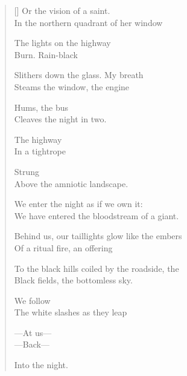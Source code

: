 \begin{verse}[\versewidth]
Or the vision of a saint.\\
In the northern quadrant of her window

The lights on the highway\\
Burn. \quad Rain-black

Slithers down the glass. \quad My breath\\
Steams the window, the engine

Hums, the bus\\
Cleaves the night in two.

The highway\\
In a tightrope

Strung\\
Above the amniotic landscape.

We enter the night as if we own it:\\
We have entered the bloodstream of a giant.

Behind us, our taillights glow like the embers\\
Of a ritual fire, an offering

To the black hills coiled by the roadside, the\\
Black fields, the bottomless sky.

We follow\\
The white slashes as they leap

---At us---\\
---Back---

Into the night.
\end{verse}
